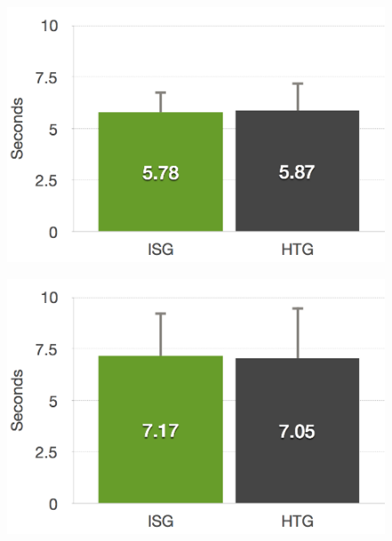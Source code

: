 \begin{figure}[htb]
	\centering
	\begin{minipage}[t]{0.40\linewidth}
		\centering
		\includegraphics[width=1\linewidth]{Pictures/6_4_DIA_StandLeftGroupEffect}
		\label{fig:6_4_standLeftGroupEffect}
	\end{minipage}
	\hfill
	\begin{minipage}[t]{0.40\linewidth}
		\centering
		\includegraphics[width=1\linewidth]{Pictures/6_4_DIA_StandRightGroupEffect}
		\label{fig:6_4_standRightGroupEffect}
	\end{minipage}
	\hfill
	\begin{minipage}[t]{0.40\linewidth}
		\centering

\end{minipage}
\end{figure}
